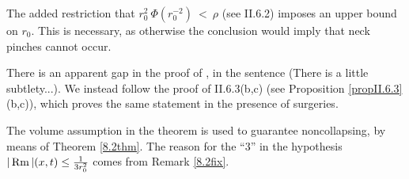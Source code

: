 \begin{remark}
  \label{rem:kl-later-scalar-curvature-bounds-bigger-balls-from-curvature-volume-bounds-existence-noncollapsing}
 \label{rmkI.12.2}
The added restriction that $r_0^2 \: \Phi(r_0^{-2}) \: < \: \rho$ (see II.6.2)
imposes an upper bound on $r_0$.  This is necessary, as
otherwise the conclusion would imply that neck pinches cannot occur.

There is an apparent gap in the proof of \cite[Theorem 12.2]{Perelman},
in the sentence
(There is a little subtlety...).  We instead follow the proof
of II.6.3(b,c) (see Proposition \ref{propII.6.3}(b,c)),
which proves the same statement in the
presence of surgeries.


The volume assumption in the theorem is used to guarantee
noncollapsing, by means of Theorem \ref{8.2thm}. The reason
for the ``$3$'' in the hypothesis $|\operatorname{Rm}|(x, t) \le \frac{1}{3r_0^{2}}$
comes from Remark \ref{8.2fix}.
\end{remark}
